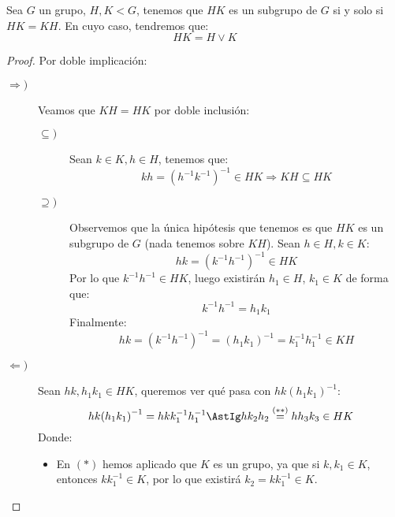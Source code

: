 \begin{prop}
    Sea $G$ un grupo, $H, K < G$, tenemos que $HK$ es un subgrupo de $G$ si y solo si $HK = KH$. En cuyo caso, tendremos que:
    \begin{equation*}
        HK = H\lor K
    \end{equation*}
    \begin{proof}
        Por doble implicación:
        \begin{description}
            \item [$\Longrightarrow)$]   Veamos que $KH = HK$ por doble inclusión:
                \begin{description}
                    \item [$\subseteq)$] Sean $k\in K, h\in H$, tenemos que:
                        \begin{equation*}
                            kh = {(h^{-1}k^{-1})}^{-1} \in HK \Longrightarrow KH \subseteq HK
                        \end{equation*}
                    \item [$\supseteq)$] Observemos que la única hipótesis que tenemos es que $HK$ es un subgrupo de $G$ (nada tenemos sobre $KH$). Sean $h\in H, k\in K$:
                        \begin{equation*}
                            hk = {(k^{-1}h^{-1})}^{-1} \in HK
                        \end{equation*}
                        Por lo que $k^{-1}h^{-1}\in HK$, luego existirán $h_1\in H$, $k_1\in K$ de forma que:
                        \begin{equation*}
                            k^{-1}h^{-1} = h_1k_1
                        \end{equation*}
                        Finalmente:
                        \begin{equation*}
                            hk = {(k^{-1}h^{-1})}^{-1} = {(h_1k_1)}^{-1} = k_1^{-1}h_1^{-1}\in KH
                        \end{equation*}
                \end{description}

            \item [$\Longleftarrow)$] Sean $ hk, h_1k_1 \in HK$, queremos ver qué pasa con $hk{(h_1k_1)}^{-1}$:
                \begin{equation*}
                    hk{(h_1k_1)}^{-1} = h k k_1^{-1} h_1^{-1} \AstIg h k_2 h_2 \stackrel{(\ast\ast)}{=} hh_3k_3 \in HK
                \end{equation*}
                Donde:
                \begin{itemize}
                    \item En $(\ast)$ hemos aplicado que $K$ es un grupo, ya que si $k,k_1\in K$, entonces $kk_1^{-1}\in K$, por lo que existirá $k_2 = kk_1^{-1} \in K$.


\end{itemize}
\end{description}
\end{proof}
\end{prop}
